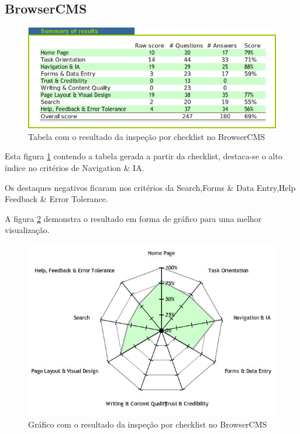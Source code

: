 \subsection{BrowserCMS}

\begin{figure}[here]
\includegraphics[width=130mm]{images/browsercms_result_checklist_table.jpg}
\caption{Tabela com o resultado da inspeção por checklist no BrowserCMS}
\label{fig:resultado_checklist_browsercms_tabela}
\end{figure}

Esta figura \ref{fig:resultado_checklist_browsercms_tabela} contendo a tabela gerada a partir da checklist, destaca-se o alto índice no critérios de Navigation & IA. 

Os destaques negativos ficaram nos critérios da Search,Forms \& Data Entry,Help Feedback \& Error Tolerance. 

A figura \ref{fig:resultado_checklist_browsercms_grafico} demonstra o resultado em forma de gráfico para uma melhor visualização.

\begin{figure}[here]
\includegraphics[scale=0.5]{images/browsercms_result_checklist_graph.jpg}
\caption{Gráfico com o resultado da inspeção por checklist no BrowserCMS}
\label{fig:resultado_checklist_browsercms_grafico}
\end{figure}

